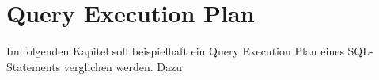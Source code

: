 \chapter{Query Execution Plan}
Im folgenden Kapitel soll beispielhaft ein Query Execution Plan eines SQL-Statements verglichen werden. Dazu 
